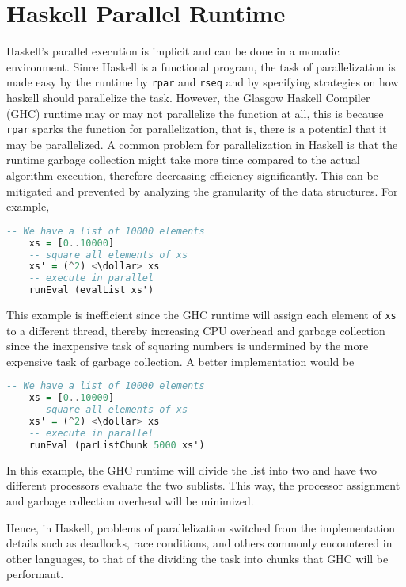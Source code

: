 \section{Haskell Parallel Runtime}
Haskell's parallel execution is implicit and can be done in a monadic environment.\cite{Marlow2013}
Since Haskell is a functional program, the task of parallelization is made easy by the runtime 
by \lstinline{rpar} and \lstinline{rseq} and by specifying strategies on how haskell should 
parallelize the task. However, the Glasgow Haskell Compiler (GHC) runtime may or may not parallelize 
the function at all, this is because \lstinline{rpar} sparks the function for parallelization, that is,
there is a potential that it may be parallelized.\cite{Marlow2005} A common problem for parallelization 
in Haskell is that the runtime garbage collection might take more time compared to the actual algorithm 
execution, therefore decreasing efficiency significantly. This can be mitigated and prevented by analyzing 
the granularity of the data structures. For example,

\begin{lstlisting}[language=Haskell]
    -- We have a list of 10000 elements
    xs = [0..10000]
    -- square all elements of xs
    xs' = (^2) <\dollar> xs
    -- execute in parallel
    runEval (evalList xs')
\end{lstlisting}

This example is inefficient since the GHC runtime will assign each element of \lstinline{xs} to a different 
thread, thereby increasing CPU overhead and garbage collection since the inexpensive task of squaring 
numbers is undermined by the more expensive task of garbage collection. A better implementation would be 
\begin{lstlisting}[language=Haskell]
    -- We have a list of 10000 elements
    xs = [0..10000]
    -- square all elements of xs
    xs' = (^2) <\dollar> xs
    -- execute in parallel
    runEval (parListChunk 5000 xs')
\end{lstlisting}
In this example, the GHC runtime will divide the list into two and have two different processors 
evaluate the two sublists. This way, the processor assignment and garbage collection overhead will be minimized.

Hence, in Haskell, problems of parallelization switched from the implementation details such as deadlocks, 
race conditions, and others commonly encountered in other languages, to that of the dividing the task into 
chunks that GHC will be performant.

